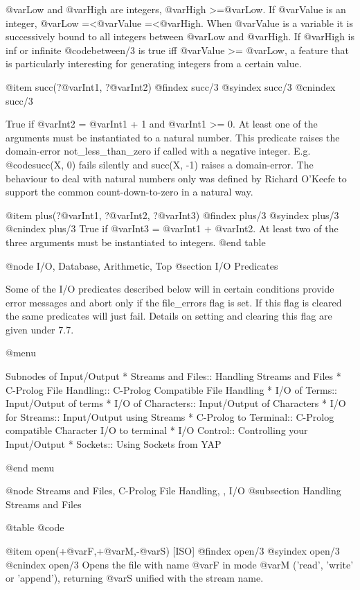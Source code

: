 {{{{    @var{Low} and @var{High} are integers, @var{High} >=@var{Low}. If
    @var{Value} is an integer, @var{Low} =<@var{Value}
    =<@var{High}. When @var{Value} is a variable it is successively
    bound to all integers between @var{Low} and @var{High}. If
    @var{High} is inf or infinite @code{between/3} is true iff
    @var{Value} >= @var{Low}, a feature that is particularly interesting
    for generating integers from a certain value.

@item succ(?@var{Int1}, ?@var{Int2})
@findex succ/3
@syindex succ/3
@cnindex succ/3

    True if @var{Int2} = @var{Int1} + 1 and @var{Int1} >= 0. At least
    one of the arguments must be instantiated to a natural number. This
    predicate raises the domain-error not_less_than_zero if called with
    a negative integer. E.g. @code{succ(X, 0)} fails silently and succ(X, -1)
    raises a domain-error. The behaviour to deal with natural numbers
    only was defined by Richard O'Keefe to support the common
    count-down-to-zero in a natural way. 

@item plus(?@var{Int1}, ?@var{Int2}, ?@var{Int3})
@findex plus/3
@syindex plus/3
@cnindex plus/3
    True if @var{Int3} = @var{Int1} + @var{Int2}. At least two of the
    three arguments must be instantiated to integers.
@end table

@node I/O, Database, Arithmetic, Top
@section I/O Predicates

Some of the I/O predicates described below will in certain conditions
provide error messages and abort only if the file_errors flag is set.
If this flag is cleared the same predicates will just fail. Details on
setting and clearing this flag are given under 7.7.

@menu

Subnodes of Input/Output
* Streams and Files:: Handling Streams and Files
* C-Prolog File Handling:: C-Prolog Compatible File Handling
* I/O of Terms:: Input/Output of terms
* I/O of Characters:: Input/Output of Characters
* I/O for Streams:: Input/Output using Streams
* C-Prolog to Terminal:: C-Prolog compatible Character I/O to terminal
* I/O Control:: Controlling your Input/Output
* Sockets:: Using Sockets from YAP

@end menu

@node Streams and Files, C-Prolog File Handling, , I/O
@subsection Handling Streams and Files

@table @code

@item open(+@var{F},+@var{M},-@var{S}) [ISO]
@findex open/3
@syindex open/3
@cnindex open/3
Opens the file with name @var{F} in mode @var{M} ('read', 'write' or
'append'), returning @var{S} unified with the stream name.

}}}}
